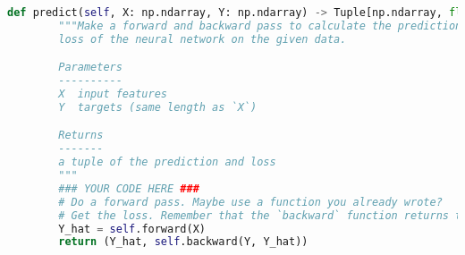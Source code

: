 \begin{lstlisting}[language=Python]
    def predict(self, X: np.ndarray, Y: np.ndarray) -> Tuple[np.ndarray, float]:
        """Make a forward and backward pass to calculate the predictions and
        loss of the neural network on the given data.

        Parameters
        ----------
        X  input features
        Y  targets (same length as `X`)

        Returns
        -------
        a tuple of the prediction and loss
        """
        ### YOUR CODE HERE ###
        # Do a forward pass. Maybe use a function you already wrote?
        # Get the loss. Remember that the `backward` function returns the loss.
        Y_hat = self.forward(X)
        return (Y_hat, self.backward(Y, Y_hat))

\end{lstlisting}

